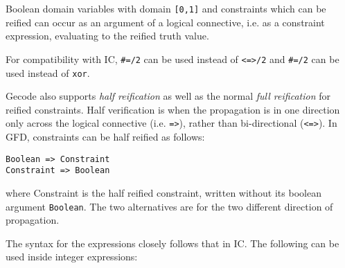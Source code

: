 \begin{description}
Boolean domain variables with domain \texttt{[0,1]} and constraints
which can be reified can occur as an argument of a logical connective, i.e.
as a constraint expression, evaluating to the reified truth value. 

For compatibility with IC, \texttt{\#=/2} can be used
instead of \texttt{<=>/2} and \texttt{\#\bsl=/2} can be used instead of
\texttt{xor}.

Gecode also supports {\em half reification\/} as well as the normal 
{\em full reification} for reified constraints. Half verification 
is when the propagation is in one direction only across the logical 
connective (i.e. \verb'=>'), rather than bi-directional (\verb'<=>'). 
In GFD, constraints can be half reified as follows:
\begin{verbatim}
Boolean => Constraint
Constraint => Boolean
\end{verbatim}
where Constraint is the half reified constraint, written without its boolean
argument \texttt{Boolean}. The two alternatives are for the two different
direction of propagation.

\end{description}

The syntax for the expressions closely follows that in IC. The 
following can be used inside integer expressions:

